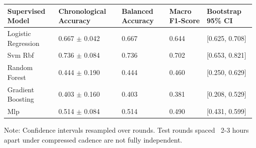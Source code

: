 \begin{tabular}{lllll}
\toprule
Supervised Model & Chronological Accuracy & Balanced Accuracy & Macro F1-Score & Bootstrap 95\% CI \\
\midrule
Logistic Regression & 0.667 $\pm$ 0.042 & 0.667 & 0.644 & [0.625, 0.708] \\
Svm Rbf & 0.736 $\pm$ 0.084 & 0.736 & 0.702 & [0.653, 0.821] \\
Random Forest & 0.444 $\pm$ 0.190 & 0.444 & 0.460 & [0.250, 0.629] \\
Gradient Boosting & 0.403 $\pm$ 0.160 & 0.403 & 0.381 & [0.208, 0.529] \\
Mlp & 0.514 $\pm$ 0.084 & 0.514 & 0.490 & [0.431, 0.599] \\
\bottomrule
\end{tabular}

\noindent\footnotesize Note: Confidence intervals resampled over rounds. Test rounds spaced ~2-3 hours apart under compressed cadence are not fully independent.
